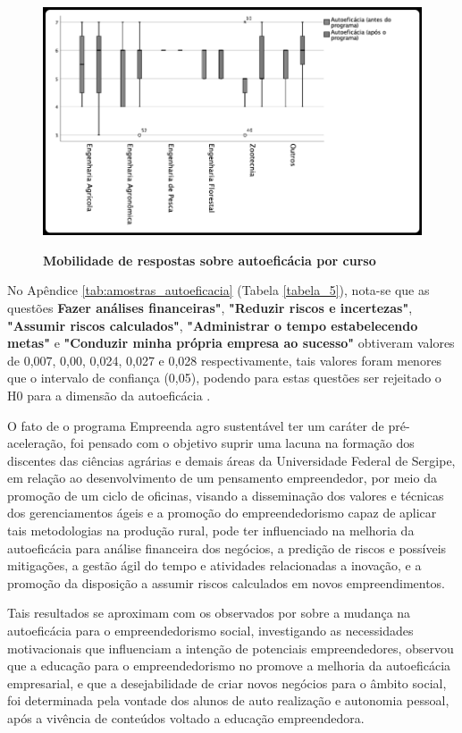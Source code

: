 \begin{figure}[H]
\centering
\caption{\textbf{Mobilidade de respostas sobre autoeficácia por curso}}
\includegraphics[scale=0.4]{Imagens/boxplot_autoeficacia.png}
\label{figura_34}
\end{figure}


No Apêndice \ref{tab:amostras_autoeficacia} (Tabela \ref{tabela_5}), nota-se que as questões \textbf{Fazer análises financeiras"}, \textbf{"Reduzir riscos e incertezas"}, \textbf{"Assumir riscos calculados"}, \textbf{"Administrar o tempo estabelecendo metas"} e \textbf{"Conduzir minha própria empresa ao sucesso"} obtiveram valores de 0,007, 0,00, 0,024, 0,027 e 0,028 respectivamente, tais valores foram menores que o intervalo de confiança (0,05), podendo para estas questões ser rejeitado o H0 para a dimensão da autoeficácia . 


O fato de o programa Empreenda agro sustentável ter um caráter de pré-aceleração, foi pensado com o objetivo suprir uma lacuna na formação dos discentes das ciências agrárias e demais áreas da Universidade Federal de Sergipe, em relação ao desenvolvimento de um pensamento empreendedor, por meio da promoção de um ciclo de oficinas, visando a disseminação dos valores e técnicas dos gerenciamentos ágeis e a promoção do empreendedorismo capaz de aplicar tais metodologias na produção rural, pode ter influenciado na melhoria da autoeficácia para análise financeira dos negócios, a predição de riscos e possíveis mitigações, a gestão ágil do tempo e atividades relacionadas a inovação, e a promoção da disposição a assumir riscos calculados em novos empreendimentos. 

Tais resultados se aproximam com os observados por  sobre a mudança na autoeficácia para o empreendedorismo social, investigando as necessidades motivacionais que influenciam a intenção de potenciais empreendedores, observou que a educação para o empreendedorismo no promove a melhoria da autoeficácia empresarial, e que a desejabilidade de criar novos negócios para o âmbito social, foi determinada pela vontade dos alunos de auto realização e autonomia pessoal, após a vivência de conteúdos voltado a educação empreendedora. 


